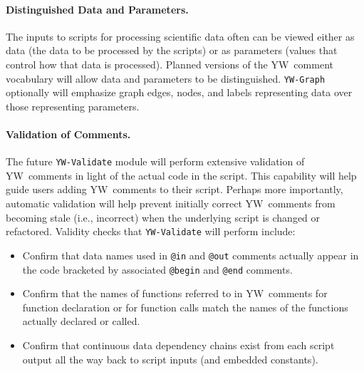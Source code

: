 \documentclass{article}
\newcommand{\YW}{\textsf{YesWorkflow}}
\newcommand{\yw}{\textsf{YW}}
\newcommand{\ywa}[1]{\texttt{#1}}
\newcommand{\ywm}[1]{\texttt{#1}}
\begin{document}

\paragraph{Distinguished Data and Parameters.}
The inputs to scripts for processing scientific data often can be
viewed either as data (the data to be processed by the scripts) or as
parameters (values that control how that data is processed).
Planned versions of the \yw\ comment vocabulary will allow data and parameters
to be distinguished. \ywm{YW-Graph} optionally will emphasize graph edges,
nodes, and labels representing data over those representing
parameters.


\paragraph{Validation of Comments.}
The future \ywm{YW-Validate} module will perform
extensive validation of \yw\ comments in light of the actual code in
the script.  This capability will help guide users adding \yw\
comments to their script. Perhaps more importantly, automatic
validation will help prevent initially correct \yw\ comments from
becoming stale (i.e., incorrect) when the underlying script is changed
or refactored.
%
Validity checks that \ywm{YW-Validate} will perform include:
\begin{itemize} 
\item Confirm that data names used in \ywa{@in} and \ywa{@out} comments
actually appear in the code bracketed by associated \ywa{@begin} and  \ywa{@end}
  comments.
\item Confirm that the names of functions referred to in \yw\ comments
  for function declaration or for function calls match the names of
  the functions actually declared or called.
\item Confirm that  continuous data dependency chains exist from each script output all
  the way back to script inputs (and embedded constants).
\end{itemize}
\end{document}
